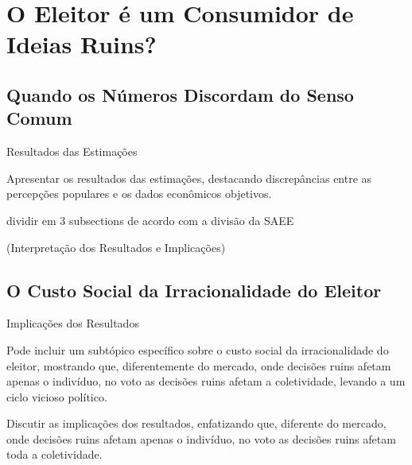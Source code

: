 


\chapter{O Eleitor é um Consumidor de Ideias Ruins?} 

\section{Quando os Números Discordam do Senso Comum} 

Resultados das Estimações

Apresentar os resultados das estimações, destacando discrepâncias entre as percepções populares e os dados econômicos objetivos.

dividir em 3 subsections de acordo com a divisão da SAEE

(Interpretação dos Resultados e Implicações)

\section{O Custo Social da Irracionalidade do Eleitor} 

Implicações dos Resultados

Pode incluir um subtópico específico sobre o custo social da irracionalidade do eleitor, mostrando que, diferentemente do mercado, onde decisões ruins afetam apenas o indivíduo, no voto as decisões ruins afetam a coletividade, levando a um ciclo vicioso político.

Discutir as implicações dos resultados, enfatizando que, diferente do mercado, onde decisões ruins afetam apenas o indivíduo, no voto as decisões ruins afetam toda a coletividade.
